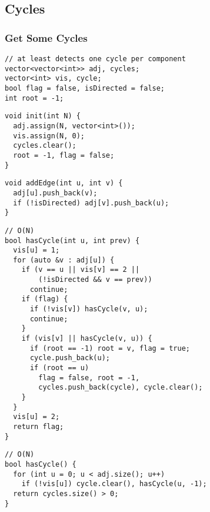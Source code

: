 \documentclass[twoside]{article}
\begin{document}
\begin{multicols*}{2}
\subsectionfont{\bfseries\sffamily\centering\LARGE}
\vspace{0em}
\subsection*{Cycles}
\vspace{2em}
\subsubsectionfont{\large\bfseries\sffamily\underline}
\subsubsection*{Get Some Cycles}
\begin{verbatim}
// at least detects one cycle per component
vector<vector<int>> adj, cycles;
vector<int> vis, cycle;
bool flag = false, isDirected = false;
int root = -1;
\end{verbatim}
\vspace{-12pt}
\begin{verbatim}
void init(int N) {
  adj.assign(N, vector<int>());
  vis.assign(N, 0);
  cycles.clear();
  root = -1, flag = false;
}
\end{verbatim}
\vspace{-12pt}
\begin{verbatim}
void addEdge(int u, int v) {
  adj[u].push_back(v);
  if (!isDirected) adj[v].push_back(u);
}
\end{verbatim}
\vspace{-12pt}
\begin{verbatim}
// O(N)
bool hasCycle(int u, int prev) {
  vis[u] = 1;
  for (auto &v : adj[u]) {
    if (v == u || vis[v] == 2 ||
        (!isDirected && v == prev))
      continue;
    if (flag) {
      if (!vis[v]) hasCycle(v, u);
      continue;
    }
    if (vis[v] || hasCycle(v, u)) {
      if (root == -1) root = v, flag = true;
      cycle.push_back(u);
      if (root == u)
        flag = false, root = -1,
        cycles.push_back(cycle), cycle.clear();
    }
  }
  vis[u] = 2;
  return flag;
}
\end{verbatim}
\vspace{-12pt}
\begin{verbatim}
// O(N)
bool hasCycle() {
  for (int u = 0; u < adj.size(); u++)
    if (!vis[u]) cycle.clear(), hasCycle(u, -1);
  return cycles.size() > 0;
}
\end{verbatim}


\end{multicols*}
\end{document}

